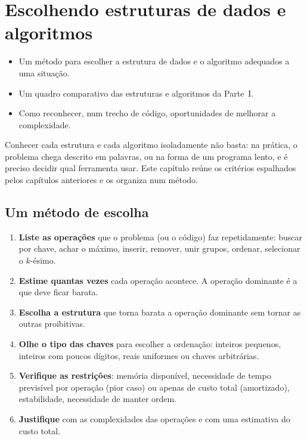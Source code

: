 \chapter{Escolhendo estruturas de dados e algoritmos}\label{cap:revisao}
\begin{objetivos}
\begin{itemize}
  \item Um método para escolher a estrutura de dados e o algoritmo adequados a uma situação.
  \item Um quadro comparativo das estruturas e algoritmos da Parte~I.
  \item Como reconhecer, num trecho de código, oportunidades de melhorar a complexidade.
\end{itemize}
\end{objetivos}

Conhecer cada estrutura e cada algoritmo isoladamente não basta: na prática, o problema chega descrito em palavras, ou na forma de um programa lento, e é preciso decidir qual ferramenta usar. Este capítulo reúne os critérios espalhados pelos capítulos anteriores e os organiza num método.

\section{Um método de escolha}\label{sec:metodo}
\begin{roteiro}
\begin{enumerate}
  \item \textbf{Liste as operações} que o problema (ou o código) faz repetidamente: buscar por chave, achar o máximo, inserir, remover, unir grupos, ordenar, selecionar o $k$-ésimo.
  \item \textbf{Estime quantas vezes} cada operação acontece. A operação dominante é a que deve ficar barata.
  \item \textbf{Escolha a estrutura} que torna barata a operação dominante sem tornar as outras proibitivas.
  \item \textbf{Olhe o tipo das chaves} para escolher a ordenação: inteiros pequenos, inteiros com poucos dígitos, reais uniformes ou chaves arbitrárias.
  \item \textbf{Verifique as restrições}: memória disponível, necessidade de tempo previsível por operação (pior caso) ou apenas de custo total (amortizado), estabilidade, necessidade de manter ordem.
  \item \textbf{Justifique} com as complexidades das operações e com uma estimativa do custo total.
\end{enumerate}
\end{roteiro}

